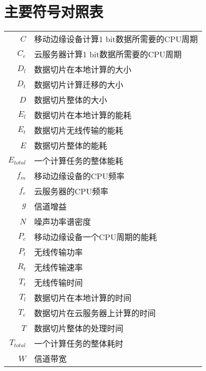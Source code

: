 \chapter{主要符号对照表}
\label{chap:symb}

\begin{longtable}{rl}
 $C$ & 移动边缘设备计算1 bit数据所需要的CPU周期\\
 $C_{e}$ & 云服务器计算1 bit数据所需要的CPU周期\\
 $D_{l}$ & 数据切片在本地计算的大小\\
 $D_{t}$ & 数据切片计算迁移的大小\\
 $D$ & 数据切片整体的大小\\
 $E_{l}$ & 数据切片在本地计算的能耗\\
 $E_{t}$ & 数据切片无线传输的能耗\\
 $E$ & 数据切片整体的能耗\\
 $E_{total}$ & 一个计算任务的整体能耗\\
 $f_{m}$ & 移动边缘设备的CPU频率\\
 $f_{e}$ & 云服务器的CPU频率\\
 $g$ & 信道增益\\
 $N$ & 噪声功率谱密度\\
 $P_{c}$ & 移动边缘设备一个CPU周期的能耗\\
 $P_{t}$ & 无线传输功率\\
 $R_{t}$ & 无线传输速率\\
 $T_{t}$ & 无线传输时间\\
 $T_{l}$ & 数据切片在本地计算的时间\\
 $T_{e}$ & 数据切片在云服务器上计算的时间\\
 $T$ & 数据切片整体的处理时间\\
 $T_{total}$ & 一个计算任务的整体耗时\\
 $W$ & 信道带宽\\
\end{longtable}
